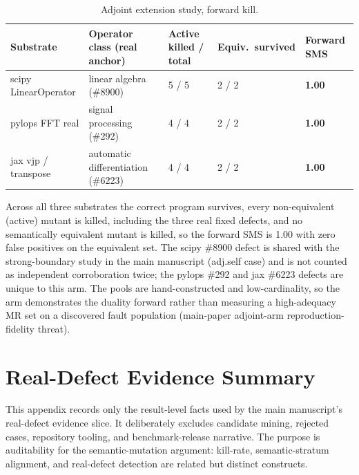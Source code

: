 \documentclass[manuscript,screen,review]{acmart}
\begin{document}
{%
\begin{longtable}[]{@{}p{2.0cm}p{3.2cm}p{2.5cm}p{1.8cm}p{1.8cm}@{}}
\caption{Adjoint extension study, forward kill.}\label{tab:suppl-adjoint}\\
\toprule\noalign{}
Substrate & Operator class (real anchor) & Active killed / total & Equiv.\ survived & Forward SMS \\
\midrule\noalign{}
\endfirsthead
\endhead
\bottomrule\noalign{}
\endlastfoot
scipy LinearOperator & linear algebra (\#8900) & 5 / 5 & 2 / 2 & \textbf{1.00} \\
pylops FFT real & signal processing (\#292) & 4 / 4 & 2 / 2 & \textbf{1.00} \\
jax vjp / transpose & automatic differentiation (\#6223) & 4 / 4 & 2 / 2 & \textbf{1.00} \\
\end{longtable}
}

Across all three substrates the correct program survives, every
non-equivalent (active) mutant is killed, including the three real
fixed defects, and no semantically equivalent mutant is killed, so the
forward SMS is 1.00 with zero false positives on the equivalent set. The
scipy \#8900 defect is shared with the strong-boundary study in the main manuscript (adj.self case)
and is not counted as independent corroboration twice; the pylops \#292
and jax \#6223 defects are unique to this arm. The pools are
hand-constructed and low-cardinality, so the arm demonstrates the duality
forward rather than measuring a high-adequacy MR set on a discovered fault
population (main-paper adjoint-arm reproduction-fidelity threat).

\section{Real-Defect Evidence Summary}\label{i.-result-level-real-defect-evidence-ledger}

This appendix records only the result-level facts used by the main
manuscript's real-defect evidence slice. It deliberately excludes
candidate mining, rejected cases, repository tooling, and benchmark-release
narrative. The purpose is auditability for the semantic-mutation argument:
kill-rate, semantic-stratum alignment, and real-defect detection are related
but distinct constructs.
\end{document}
